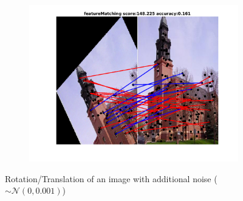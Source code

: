 \documentclass[
	fontsize=12pt,
	paper=a4,
	twoside=false,
	numbers=noenddot,
	plainheadsepline,
	toc=listof,
	toc=bibliography
]{scrartcl}
\begin{document}
\begin{figure}[h]
\begin{subfigure}[b]{0.33\textwidth}
		\includegraphics[scale=0.25]{"fig_ver2608/RealImages/ImgTrafo/no_descr/using_cpd_afftrafo/fi_5_featureMatching"} 
	\end{subfigure} 	
	\caption{Rotation/Translation of an image with additional noise ($\sim\mathcal{N}(0,0.001)$)}
\end{figure}

\FloatBarrier
\end{document}
